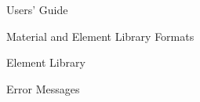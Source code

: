 \begin{chapter}{Users' Guide\label{app:user.guide}}
\begin{section}{Material and Element Library Formats}
\begin{subsection}{Element Library\label{app:user.elelib}}
      \begin{center}
      \end{center}

    \end{subsection}

  \end{section}


  \begin{section}{Error Messages}\label{app:errors}
    
    

  \end{section}
  

\end{chapter}

